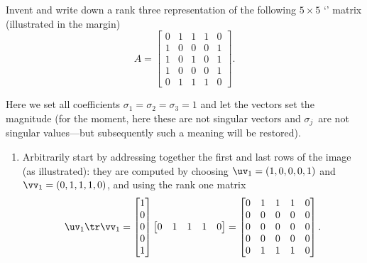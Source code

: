 \begin{example} \label{eg:}
Invent and write down a rank three representation of the following \(5\times5\) `' matrix (illustrated in the margin)
\marginpar{}
\begin{equation*}
A=\begin{bmatrix} 0&1&1&1&0
\\1&0&0&0&1
\\1&0&1&0&1
\\1&0&0&0&1
\\0&1&1&1&0 \end{bmatrix}.
\end{equation*}
\begin{solution} 
Here we set all coefficients \(\sigma_1=\sigma_2=\sigma_3=1\) and let the vectors set the magnitude (for the moment, here these are not singular vectors and \(\sigma_j\)~are not singular values---but subsequently such a meaning will be restored).
\begin{enumerate}
\item Arbitrarily start by addressing together the first and last rows of the image (as illustrated): they are computed by choosing  \(\uv_1=(1,0,0,0,1)\) and \(\vv_1=(0,1,1,1,0)\), and using the rank one matrix
\marginpar{}
\begin{equation*}
\uv_1\tr\vv_1
=\begin{bmatrix} 1\\0\\0\\0\\1 \end{bmatrix}
\begin{bmatrix} 0&1&1&1&0 \end{bmatrix}
=\begin{bmatrix} 0&1&1&1&0
\\0&0&0&0&0
\\0&0&0&0&0
\\0&0&0&0&0
\\0&1&1&1&0 \end{bmatrix}.
\end{equation*}


\end{enumerate}
\end{solution}
\end{example}
